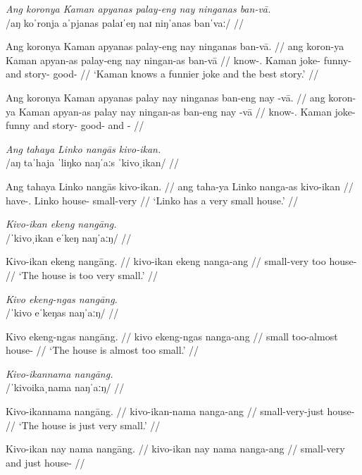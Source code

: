 \documentclass[12pt,a4paper]{scrartcl}
\newcommand{\TsgM}{{\Tsg}.{\M}}
\begin{document}
\pex
\a\begingl
\glpreamble \textit{Ang koronya Kaman apyanas palay-eng nay ninganas ban-vā.} \\
	/aŋ koˈronja aˈpjanas palaɪˈeŋ naɪ niŋˈanas banˈvaː/ //

\gla Ang koronya Kaman apyanas palay-eng nay ninganas ban-vā. //
\glb ang koron-ya Kaman apyan-as palay-eng nay ningan-as ban-vā //
\glc \AgtT{} know-\TsgM{} Kaman joke-\Parg{} funny-\Comp{} and story-\Parg{} good-\Supl{} //
\glft `Kaman knows a funnier joke and the best story.' //
\endgl

\a\ljudge*\begingl
\gla Ang koronya Kaman apyanas palay nay ninganas ban-eng nay -vā. //
\glb ang koron-ya Kaman apyan-as palay nay ningan-as ban-eng nay -vā //
\glc \AgtT{} know-\TsgM{} Kaman joke-\Parg{} funny and story-\Parg{} good-\Comp{} and -\Supl{} //
\endgl
\xe

\ex\begingl
\glpreamble \textit{Ang tahaya Linko nangās kivo-ikan.} \\
	/aŋ taˈhaja ˈliŋko naŋˈaːs ˈkivoˌikan/ //

\gla Ang tahaya Linko nangās kivo-ikan. //
\glb ang taha-ya Linko nanga-as kivo-ikan //
\glc \AgtT{} have-\TsgM{} Linko house-\Parg{} small-very //
\glft `Linko has a very small house.' //
\endgl\xe

\ex\ljudge*\begingl
\glpreamble \textit{Kivo-ikan ekeng nangāng.} \\
	/ˈkivoˌikan eˈkeŋ naŋˈaːŋ/ //

\gla Kivo-ikan ekeng nangāng. //
\glb kivo-ikan ekeng nanga-ang //
\glc small-very too house-\Aarg{} //
\glft `The house is too very small.' //
\endgl\xe

\ex\begingl
\glpreamble \textit{Kivo ekeng-ngas nangāng.} \\
	/ˈkivo eˈkeŋas naŋˈaːŋ/ //

\gla Kivo ekeng-ngas nangāng. //
\glb kivo ekeng-ngas nanga-ang //
\glc small too-almost house-\Aarg{} //
\glft `The house is almost too small.' //
\endgl\xe

\pex
\a\begingl
\glpreamble \textit{Kivo-ikannama nangāng.} \\
	/ˈkivoikaˌnama naŋˈaːŋ/ //

\gla Kivo-ikannama nangāng. //
\glb kivo-ikan-nama nanga-ang //
\glc small-very-just house-\Aarg{} //
\glft `The house is just very small.' //
\endgl

\a\ljudge*\begingl
\gla Kivo-ikan nay nama nangāng. //
\glb kivo-ikan nay nama nanga-ang //
\glc small-very and just house-\Aarg{} //
\endgl
\end{document}
